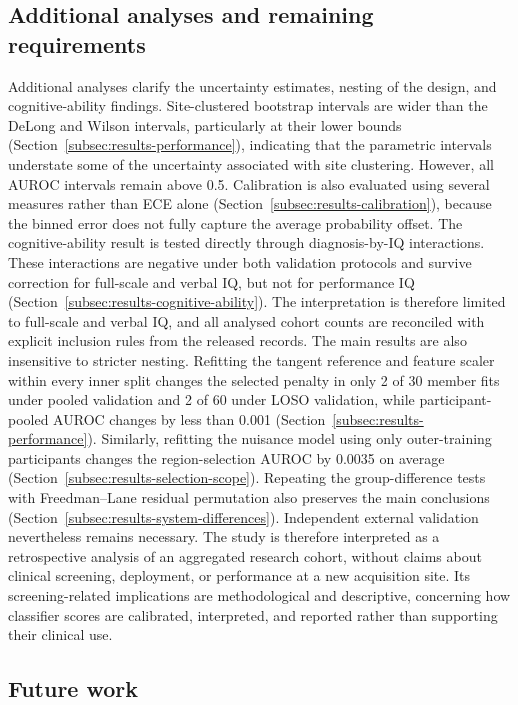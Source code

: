 \subsection{Additional analyses and remaining requirements}
\label{subsec:required-validation}

Additional analyses clarify the uncertainty estimates, nesting of the design, and cognitive-ability findings. Site-clustered bootstrap intervals are wider than the DeLong and Wilson intervals, particularly at their lower bounds (Section~\ref{subsec:results-performance}), indicating that the parametric intervals understate some of the uncertainty associated with site clustering. However, all AUROC intervals remain above 0.5. Calibration is also evaluated using several measures rather than ECE alone (Section~\ref{subsec:results-calibration}), because the binned error does not fully capture the average probability offset. The cognitive-ability result is tested directly through diagnosis-by-IQ interactions. These interactions are negative under both validation protocols and survive correction for full-scale and verbal IQ, but not for performance IQ (Section~\ref{subsec:results-cognitive-ability}). The interpretation is therefore limited to full-scale and verbal IQ, and all analysed cohort counts are reconciled with explicit inclusion rules from the released records. The main results are also insensitive to stricter nesting. Refitting the tangent reference and feature scaler within every inner split changes the selected penalty in only 2 of 30 member fits under pooled validation and 2 of 60 under LOSO validation, while participant-pooled AUROC changes by less than 0.001 (Section~\ref{subsec:results-performance}). Similarly, refitting the nuisance model using only outer-training participants changes the region-selection AUROC by 0.0035 on average (Section~\ref{subsec:results-selection-scope}). Repeating the group-difference tests with Freedman--Lane residual permutation also preserves the main conclusions (Section~\ref{subsec:results-system-differences}). Independent external validation nevertheless remains necessary. The study is therefore interpreted as a retrospective analysis of an aggregated research cohort, without claims about clinical screening, deployment, or performance at a new acquisition site. Its screening-related implications are methodological and descriptive, concerning how classifier scores are calibrated, interpreted, and reported rather than supporting their clinical use.

\subsection{Future work}
\label{subsec:future-work}


